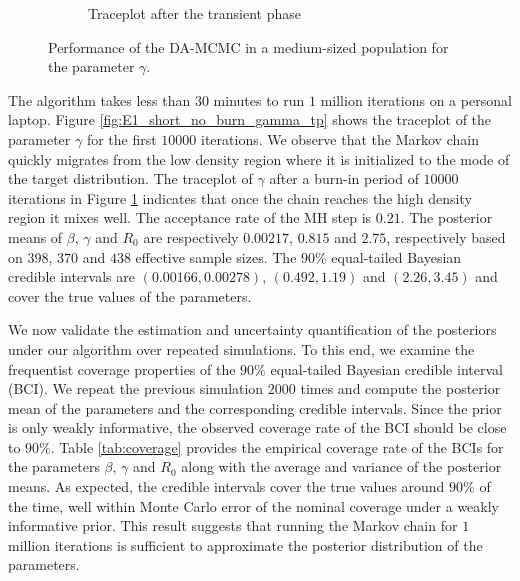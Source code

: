 \documentclass[11pt]{article}
\begin{document}
\begin{figure}
\begin{subfigure}[b]{0.32\textwidth}
			\caption{Traceplot after the transient phase}
			\label{fig:E1_burn_gamma_tp}
		\end{subfigure}
		\caption{Performance of the DA-MCMC in a medium-sized population for the parameter $\gamma$.}
		\label{fig:E1}
	\end{figure}
	
	The algorithm takes less than $30$ minutes to run $1$ million iterations on a personal laptop. 
	Figure \ref{fig:E1_short_no_burn_gamma_tp} shows the traceplot of the parameter $\gamma$ for the first $10000$ iterations. We observe that the Markov chain quickly migrates from the low density region where it is initialized to the mode of the target distribution. The traceplot of $\gamma$ after a burn-in period of $10000$ iterations in Figure \ref{fig:E1_burn_gamma_tp} indicates that once the chain reaches the high density region it mixes well. The acceptance rate of the MH step is $0.21$.
	The posterior means of $\beta$, $\gamma$ and $R_0$ are respectively $0.00217$, $0.815$ and $2.75$, respectively based on $398$, $370$ and $438$ effective sample sizes. The $90\%$ equal-tailed Bayesian credible intervals are $(0.00166, 0.00278)$, $(0.492, 1.19)$ and $(2.26, 3.45)$ and cover the true values of the parameters. 
	
	We now validate the estimation and uncertainty quantification of the posteriors under our algorithm over repeated simulations. To this end, we examine the frequentist coverage properties of the $90\%$ equal-tailed Bayesian credible interval (BCI). We repeat the previous simulation $2000$ times and compute the posterior mean of the parameters and the corresponding credible intervals. Since the prior is only weakly informative, the observed coverage rate of the BCI should be close to $90\%$.
	Table \ref{tab:coverage} provides the empirical coverage rate of the BCIs for the parameters $\beta$, $\gamma$ and $R_0$ along with the average and variance of the posterior means. As expected, the credible intervals cover the true values around $90\%$ of the time, well within Monte Carlo error of the nominal coverage under a weakly informative prior. This result suggests that running the Markov chain for $1$ million iterations is sufficient to approximate the posterior distribution of the parameters.
	
\end{document}
